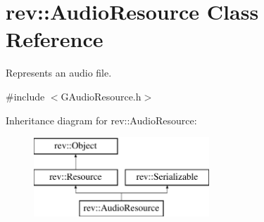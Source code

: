 \hypertarget{classrev_1_1_audio_resource}{}\section{rev\+::Audio\+Resource Class Reference}
\label{classrev_1_1_audio_resource}


Represents an audio file.  




{\ttfamily \#include $<$G\+Audio\+Resource.\+h$>$}

Inheritance diagram for rev\+::Audio\+Resource\+:\begin{figure}[H]
\begin{center}
\leavevmode
\includegraphics[height=3.000000cm]{classrev_1_1_audio_resource}
\end{center}
\end{figure}
